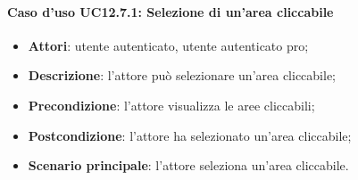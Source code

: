 \paragraph{Caso d'uso UC12.7.1: Selezione di un'area cliccabile}
\begin{itemize}
\item \textbf{Attori}: utente autenticato, utente autenticato pro;
\item \textbf{Descrizione}: l'attore può selezionare un'area cliccabile;
\item \textbf{Precondizione}: l'attore visualizza le aree cliccabili;
\item \textbf{Postcondizione}: l'attore ha selezionato un'area cliccabile;
\item \textbf{Scenario principale}: l'attore seleziona un'area cliccabile.
\end{itemize}